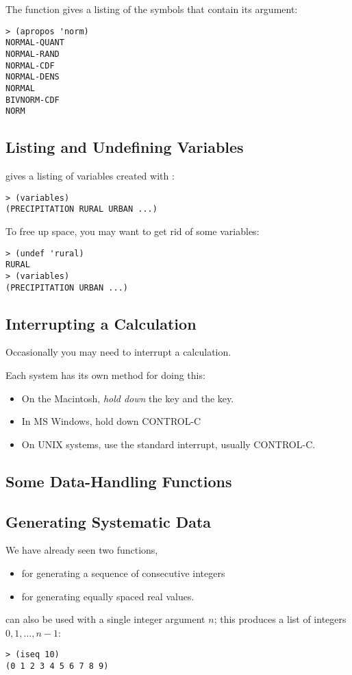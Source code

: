 \begin{slide}{}
The function  gives a listing of the symbols that
contain its argument:
{\Large
\begin{verbatim}
> (apropos 'norm)
NORMAL-QUANT
NORMAL-RAND
NORMAL-CDF
NORMAL-DENS
NORMAL
BIVNORM-CDF
NORM
\end{verbatim}}
\end{slide}

\begin{slide}{}
\subsection{Listing and Undefining Variables}
 gives a listing of variables created with :
\begin{verbatim}
> (variables)
(PRECIPITATION RURAL URBAN ...)
\end{verbatim}
To free up space, you may want to get rid of some variables:
\begin{verbatim}
> (undef 'rural)
RURAL
> (variables)
(PRECIPITATION URBAN ...)
\end{verbatim}
\end{slide}

\begin{slide}{}
\subsection{Interrupting a Calculation}
Occasionally you may need to interrupt a calculation.

Each system has its own method for doing this:
\begin{itemize}
\item
On the Macintosh, {\em hold down} the  key and the
 key.
\item
In MS Windows, hold down CONTROL-C
\item
On UNIX systems, use the standard interrupt, usually CONTROL-C.
\end{itemize}
\end{slide}

\begin{slide}{}
\section{Some Data-Handling Functions}
\subsection{Generating Systematic Data}
We have already seen two functions,
\begin{itemize}
\item {} for generating a sequence of consecutive integers
\item {} for generating equally spaced real values.
\end{itemize}
 can also be used with a single integer argument $n$;
this produces a list of integers $0, 1, \ldots, n - 1$:
\begin{verbatim}
> (iseq 10)
(0 1 2 3 4 5 6 7 8 9)
\end{verbatim}
\end{slide}

